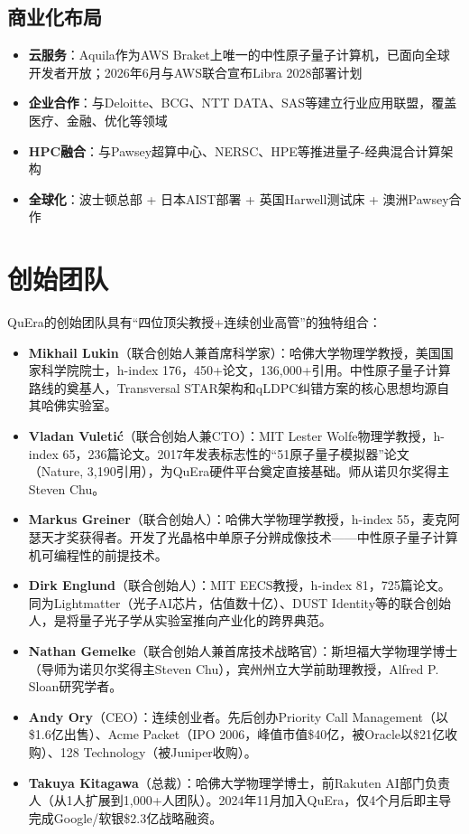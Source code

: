 \documentclass[11pt,a4paper]{ctexart}
\begin{document}
\subsection{商业化布局}

\begin{itemize}
\item \textbf{云服务}：Aquila作为AWS Braket上唯一的中性原子量子计算机，已面向全球开发者开放；2026年6月与AWS联合宣布Libra 2028部署计划
\item \textbf{企业合作}：与Deloitte、BCG、NTT DATA、SAS等建立行业应用联盟，覆盖医疗、金融、优化等领域
\item \textbf{HPC融合}：与Pawsey超算中心、NERSC、HPE等推进量子-经典混合计算架构
\item \textbf{全球化}：波士顿总部 + 日本AIST部署 + 英国Harwell测试床 + 澳洲Pawsey合作
\end{itemize}

\section{创始团队}

QuEra的创始团队具有``四位顶尖教授+连续创业高管''的独特组合：

\begin{itemize}
\item \textbf{Mikhail Lukin}（联合创始人兼首席科学家）：哈佛大学物理学教授，美国国家科学院院士，h-index 176，450+论文，136,000+引用。中性原子量子计算路线的奠基人，Transversal STAR架构和qLDPC纠错方案的核心思想均源自其哈佛实验室。

\item \textbf{Vladan Vuleti\'c}（联合创始人兼CTO）：MIT Lester Wolfe物理学教授，h-index 65，236篇论文。2017年发表标志性的``51原子量子模拟器''论文（Nature, 3,190引用），为QuEra硬件平台奠定直接基础。师从诺贝尔奖得主Steven Chu。

\item \textbf{Markus Greiner}（联合创始人）：哈佛大学物理学教授，h-index 55，麦克阿瑟天才奖获得者。开发了光晶格中单原子分辨成像技术——中性原子量子计算机可编程性的前提技术。

\item \textbf{Dirk Englund}（联合创始人）：MIT EECS教授，h-index 81，725篇论文。同为Lightmatter（光子AI芯片，估值数十亿）、DUST Identity等的联合创始人，是将量子光子学从实验室推向产业化的跨界典范。

\item \textbf{Nathan Gemelke}（联合创始人兼首席技术战略官）：斯坦福大学物理学博士（导师为诺贝尔奖得主Steven Chu），宾州州立大学前助理教授，Alfred P. Sloan研究学者。

\item \textbf{Andy Ory}（CEO）：连续创业者。先后创办Priority Call Management（以\$1.6亿出售）、Acme Packet（IPO 2006，峰值市值\$40亿，被Oracle以\$21亿收购）、128 Technology（被Juniper收购）。

\item \textbf{Takuya Kitagawa}（总裁）：哈佛大学物理学博士，前Rakuten AI部门负责人（从1人扩展到1,000+人团队）。2024年11月加入QuEra，仅4个月后即主导完成Google/软银\$2.3亿战略融资。
\end{itemize}
\end{document}
